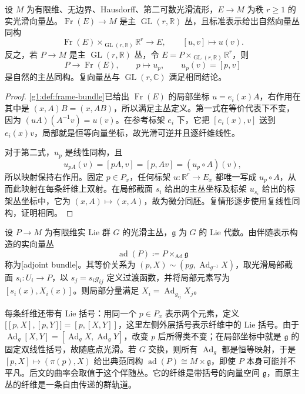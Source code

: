 \begin{proposition}\label{g1:prop:frame-associated-equivalence}
	设 \(M\) 为有限维、无边界、Hausdorff、第二可数光滑流形，\(E\to M\) 为秩 \(r\geq1\) 的实光滑向量丛。\(\operatorname{Fr}(E)\to M\) 是主 \(\operatorname{GL}(r,\mathbb R)\) 丛，且标准表示给出自然向量丛同构
	\[
		\operatorname{Fr}(E)\times_{\operatorname{GL}(r,\mathbb R)}\mathbb R^r
		\longrightarrow E,\qquad [u,v]\longmapsto u(v).
	\]
	反之，若 \(P\to M\) 是主 \(\operatorname{GL}(r,\mathbb R)\) 丛，令 \(E=P\times_{\operatorname{GL}(r,\mathbb R)}\mathbb R^r\)，则
	\[
		P\longrightarrow\operatorname{Fr}(E),\qquad
		p\longmapsto u_p,\qquad u_p(v)=[p,v]
	\]
	是自然的主丛同构。复向量丛与 \(\operatorname{GL}(r,\mathbb C)\) 满足相同结论。
\end{proposition}
\begin{proof}
	\cref{g1:def:frame-bundle}已给出 \(\operatorname{Fr}(E)\) 的局部坐标 \(u=e_i(x)A\)，右作用在其中是 \((x,A)B=(x,AB)\)，所以满足主丛定义。第一式在等价代表下不变，因为 \((uA)(A^{-1}v)=u(v)\)。在参考标架 \(e_i\) 下，它把 \([e_i(x),v]\) 送到 \(e_i(x)v\)，局部就是恒等向量坐标，故光滑可逆并且逐纤维线性。

	对于第二式，\(u_p\) 是线性同构，且
	\[
		u_{pA}(v)=[pA,v]=[p,Av]=(u_p\circ A)(v),
	\]
	所以映射保持右作用。固定 \(p\in P_x\)，任何标架 \(u:\mathbb R^r\to E_x\) 都唯一写成 \(u_p\circ A\)，从而此映射在每条纤维上双射。在局部截面 \(s_i\) 给出的主丛坐标及标架 \(u_{s_i}\) 给出的标架丛坐标中，它为 \((x,A)\mapsto(x,A)\)，故为微分同胚。复情形逐步使用复线性同构，证明相同。
\end{proof}

\begin{definition}\label{g1:def:adjoint-bundle}
	设 \(P\to M\) 为有限维实 Lie 群 \(G\) 的光滑主丛，\(\mathfrak g\) 为 \(G\) 的 Lie 代数。由伴随表示构造的实向量丛
	\[
		\operatorname{ad}(P)\coloneqq P\times_{\operatorname{Ad}}\mathfrak g
	\]
	称为[adjoint bundle]。其等价关系为 \((p,X)\sim(pg,\operatorname{Ad}_{g^{-1}}X)\)，取光滑局部截面 \(s_i:U_i\to P\)，以 \(s_j=s_i g_{ij}\) 定义过渡函数，并将局部元素写为 \([s_i(x),X_i(x)]\)。则局部分量满足 \(X_i=\operatorname{Ad}_{g_{ij}}X_j\)。
\end{definition}

每条纤维还带有 Lie 括号：用同一个 \(p\in P_x\) 表示两个元素，定义 \(\bigl[[p,X],[p,Y]\bigr]=[p,[X,Y]]\)，这里左侧外层括号表示纤维中的 Lie 括号。由于 \(\operatorname{Ad}_g[X,Y]=[\operatorname{Ad}_gX,\operatorname{Ad}_gY]\)，改变 \(p\) 后所得类不变；在局部坐标中就是 \(\mathfrak g\) 的固定双线性括号，故随底点光滑。若 \(G\) 交换，则所有 \(\operatorname{Ad}_g\) 都是恒等映射，于是 \([p,X]\mapsto(\pi(p),X)\) 给出典范同构 \(\operatorname{ad}(P)\cong M\times\mathfrak g\)，即使 \(P\) 本身可能并不平凡。后文的曲率会取值于这个伴随丛。它的纤维是带括号的向量空间 \(\mathfrak g\)，而原主丛的纤维是一条自由传递的群轨道。

